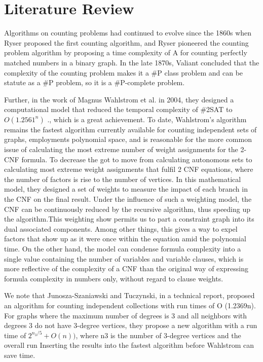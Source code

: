 \documentclass{sigchi}
\begin{document}
\section{Literature Review}
Algorithms on counting problems had continued to evolve since the 1860s when Ryser proposed the first counting algorithm\cite{10.1017/s0013091500011299}, and Ryser pioneered the counting problem algorithm by proposing a time complexity of A for counting perfectly matched numbers in a binary graph. In the late 1870s, Valiant concluded that the complexity of the counting problem makes it a \#P class problem and can be statute as a \#P problem, so it is a \#P-complete problem\cite{10.1016/0304-3975(79)90044-6}.

Further, in the work of Magnus Wahlstrom et al. in 2004, they designed a computational model that reduced the temporal complexity of \#2SAT to  $ O\left ( 1.2561^{n} \right )$ \cite{10.1016/j.tcs.2004.10.037}., which is a great achievement. To date, Wahlstrom's algorithm remains the fastest algorithm currently available for counting independent sets of graphs,\cite{Lee} employments polynomial space, and is reasonable for the more common issue of calculating the most extreme number of weight assignments for the 2-CNF formula. To decrease the got to move from calculating autonomous sets to calculating most extreme weight assignments that fulfil 2 CNF equations, where the number of factors is rise to the number of vertices. In this mathematical model, they designed a set of weights to measure the impact of each branch in the CNF on the final result. Under the influence of such a weighting model, the CNF can be continuously reduced by the recursive algorithm, thus speeding up the algorithm.This weighting show permits us to part a constraint graph into its dual associated components. Among other things, this gives a way to expel factors that show up as it were once within the equation amid the polynomial time. On the other hand, the model can condense formula complexity into a single value containing the number of variables and variable clauses, which is more reflective of the complexity of a CNF than the original way of expressing formula complexity in numbers only, without regard to clause weights.

We note that Junosza-Szaniawski and Tuczynski, in a technical report, proposed an algorithm for counting independent collections with run times of O (1.2369n).\cite{undefined} For graphs where the maximum number of degrees is 3 and all neighbors with degrees 3 do not have 3-degree vertices, they propose a new algorithm with a run time of $2^{n_{3}/5} +O\left( n \right))$, where n3 is the number of 3-degree vertices and the overall run Inserting the results into the fastest algorithm before Wahlstrom \cite{10.1016/j.tcs.2004.10.037} can save time.
\end{document}

